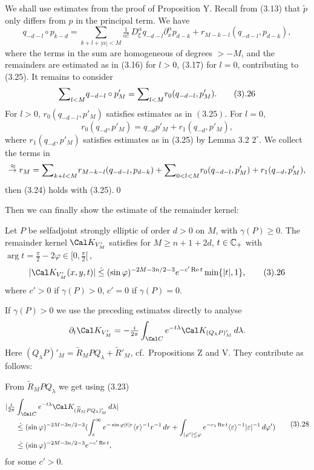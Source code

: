  We shall use estimates from the proof of Proposition
Y. Recall from (3.13) that $\tilde p$ only differs from $p$ in the
principal term. We have
$$
q_{-d-l}\circ p_{k-d}={\sum}_{k+l+|\alpha| < {M}} \tfrac{1}{\alpha!}\ D_\xi^\alpha
q_{-d-l} \partial_x^\alpha  p_{d-k} + r_{{M}-k-l}(q_{-d-l},
 p_{d-k}),
$$
where the terms in the sum are homogeneous of degrees $>-M$, and the
remainders are estimated as in (3.16) for $l>0$, (3.17) for $l=0$,
contributing to (3.25). It
remains to consider
$$
{\sum}_{l<M}q_{-d-l}\circ p'_M={\sum}_{l<M}r_0(q_{-d-l}, p'_M).\tag 3.26
$$
For $l>0$, $r_0(q_{-d-l}, p'_M)$ satisfies estimates as in
$(3.25)$. For $l=0$,
$$
r_0(q_{-d}, p'_M)=q_{-d}p'_M+r_1(q_{-d}, p'_M),
$$
where $r_1(q_{-d}, p'_M)$ satisfies estimates as in (3.25) by Lemma 3.2
$2^\circ$. We collect the terms in
$$
\overset{\,\approx}\to r_M={\sum}_{k+l<M}r_{{M}-k-l}(q_{-d-l}, p_{d-k})+{\sum}_{0<l<M}r_0(q_{-d-l}, p'_M)+
r_1(q_{-d}, p'_M),
$$
then (3.24) holds with (3.25).\qed
\enddemo

Then we can finally show the estimate of the remainder kernel:

 Let $P$ be selfadjoint strongly elliptic of order
$d>0$ on $M$, with $\gamma (P)\ge 0$. The remainder kernel $\Cal
K_{V'_M}$ satisfies for $M\ge n+1+2d$, $t\in {\Bbb C}_+$ with $\arg
t=\frac\pi 2-2\varphi \in [0,\frac\pi 2[\,$,
$$
|\Cal K_{V'_M}(x,y,t)|\leg (\sin\varphi
)^{-2M-3n/2-3}e^{-c'\operatorname{Re}t}\operatorname{min} \{|t|, 1\}
,\tag 3.26
$$
where $c'>0$ if $\gamma (P)>0$,  $c'=0$ if $\gamma (P)=0$.
\endproclaim

 If $\gamma (P)>0$ we use the preceding estimates directly
to analyse
$$
\partial_t\Cal K_{V'_M}=-\tfrac i {2\pi }\int_{\Cal C}e^{-t\lambda
}\Cal K_{(Q _\lambda P)'_M}\,d\lambda.
$$
Here $(Q_\lambda P)'_M=\widetilde R_MPQ_\lambda +\widetilde R'_M$, cf.\
Propositions Z and V. They contribute as follows:

From $\widetilde R_MPQ_\lambda$ we get using (3.23)
$$
\aligned
|\tfrac i {2\pi }&\int_{\Cal C}e^{-t\lambda
}\Cal K_{(\widetilde R_MPQ _\lambda )'_M}\,d\lambda|\\
&\leg (\sin\varphi
)^{-2M-3n/2-3}(\int_\varepsilon ^\infty e^{-\sin\varphi |t|r}\ang
r^{-1}r^{-1}\,dr +\int_{|\varphi '|\le \varphi
}e^{-c_1\operatorname{Re}t}\ang\varepsilon ^{-1}|\varepsilon
|^{-1}\,d\varphi ')\\
&\leg (\sin\varphi
)^{-2M-3n/2-3}e^{-c'\operatorname{Re}t},
\endaligned\tag3.28$$
 for some $c'>0$.


